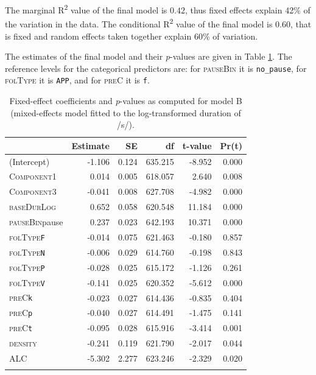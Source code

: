 The marginal R\textsuperscript{2} value of the final model is $0.42$, thus fixed effects explain 42\% of the variation in the data. The conditional R\textsuperscript{2} value of the final model is $0.60$, that is fixed and random effects taken together explain 60\% of variation.

The estimates of the final model and their \textit{p}-values are given in Table \ref{tab:5.9}. The reference levels for the categorical predictors are: for \textsc{pauseBin} it is \texttt{no\_pause}, for \textsc{folType} it is \texttt{APP}, and for \textsc{preC} it is \texttt{f}.

\begin{table}\fontsize{10}{11}
\caption{Fixed-effect coefficients and \textit{p}-values as computed for model B (mixed-effects model fitted to the log-transformed duration of /s/).}
\label{tab:5.9}
\centering
\begin{tabular}{lrrrrr} 
\lsptoprule
~             & Estimate & SE    & df      & t-value & Pr(\textbar{}t\textbar{})  \\ 
\midrule
(Intercept)   & -1.106   & 0.124 & 635.215 & -8.952  & 0.000                      \\
\textsc{Component1}    & 0.014    & 0.005 & 618.057 & 2.640   & 0.008                      \\
\textsc{Component3}    & -0.041   & 0.008 & 627.708 & -4.982  & 0.000                      \\
\textsc{baseDurLog}    & 0.652    & 0.058 & 620.548 & 11.184  & 0.000                      \\
\textsc{pauseBin}pause & 0.237    & 0.023 & 642.193 & 10.371  & 0.000                      \\
\textsc{folType}\texttt{F}      & -0.014   & 0.075 & 621.463 & -0.180  & 0.857                      \\
\textsc{folType}\texttt{N}      & -0.006   & 0.029 & 614.760 & -0.198  & 0.843                      \\
\textsc{folType}\texttt{P}      & -0.028   & 0.025 & 615.172 & -1.126  & 0.261                      \\
\textsc{folType}\texttt{V}      & -0.141   & 0.025 & 620.352 & -5.612  & 0.000                      \\
\textsc{preC}\texttt{k}         & -0.023   & 0.027 & 614.436 & -0.835  & 0.404                      \\
\textsc{preC}\texttt{p}         & -0.040   & 0.027 & 614.491 & -1.475  & 0.141                      \\
\textsc{preC}\texttt{t}         & -0.095   & 0.028 & 615.916 & -3.414  & 0.001                      \\
\textsc{density}       & -0.241   & 0.119 & 621.790 & -2.017  & 0.044                      \\
\textsc{ALC}           & -5.302   & 2.277 & 623.246 & -2.329  & 0.020                      \\
\lspbottomrule
\end{tabular}
\end{table}

